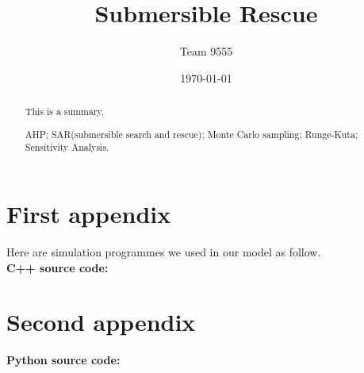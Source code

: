 \documentclass{mcmthsis}  %
\title{Submersible Rescue}  %
\author{\small Team 9555}  %
\date{\today}  %
\begin{document}
\begin{abstract}  %
This is a summary.
\begin{keywords}  %
AHP; SAR(submersible search and rescue); Monte Carlo sampling; Runge-Kuta; Sensitivity Analysis.
\end{keywords}  %
\end{abstract}  %
\maketitle  %
\tableofcontents  %



\newpage  %


% 






\newpage
\printbibliography  %


\newpage
\begin{appendices}  %
\section{First appendix}  %
Here are simulation programmes we used in our model as follow.\\
\textbf{C++ source code:}

\section{Second appendix}  %
\textbf{Python source code:}




\end{appendices}  %
\end{document}
